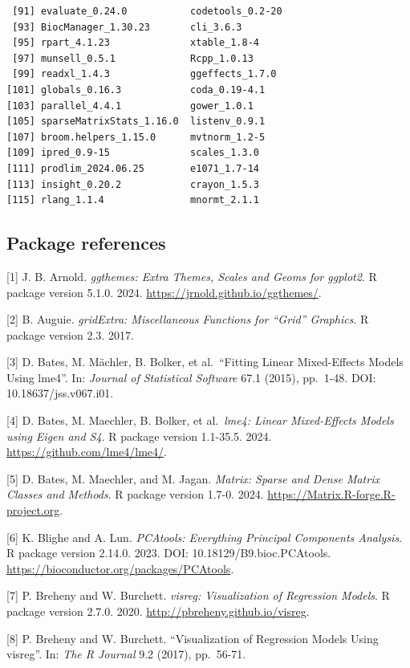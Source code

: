 \documentclass[
  letterpaper,
  DIV=11,
  numbers=noendperiod]{scrreprt}
\begin{document}
\begin{verbatim}
 [91] evaluate_0.24.0           codetools_0.2-20         
 [93] BiocManager_1.30.23       cli_3.6.3                
 [95] rpart_4.1.23              xtable_1.8-4             
 [97] munsell_0.5.1             Rcpp_1.0.13              
 [99] readxl_1.4.3              ggeffects_1.7.0          
[101] globals_0.16.3            coda_0.19-4.1            
[103] parallel_4.4.1            gower_1.0.1              
[105] sparseMatrixStats_1.16.0  listenv_0.9.1            
[107] broom.helpers_1.15.0      mvtnorm_1.2-5            
[109] ipred_0.9-15              scales_1.3.0             
[111] prodlim_2024.06.25        e1071_1.7-14             
[113] insight_0.20.2            crayon_1.5.3             
[115] rlang_1.1.4               mnormt_2.1.1             
\end{verbatim}

\subsection{Package references}\label{package-references-4}

{[}1{]} J. B. Arnold. \emph{ggthemes: Extra Themes, Scales and Geoms for
ggplot2}. R package version 5.1.0. 2024.
\url{https://jrnold.github.io/ggthemes/}.

{[}2{]} B. Auguie. \emph{gridExtra: Miscellaneous Functions for ``Grid''
Graphics}. R package version 2.3. 2017.

{[}3{]} D. Bates, M. Mächler, B. Bolker, et al.~``Fitting Linear
Mixed-Effects Models Using lme4''. In: \emph{Journal of Statistical
Software} 67.1 (2015), pp.~1-48. DOI: 10.18637/jss.v067.i01.

{[}4{]} D. Bates, M. Maechler, B. Bolker, et al.~\emph{lme4: Linear
Mixed-Effects Models using Eigen and S4}. R package version 1.1-35.5.
2024. \url{https://github.com/lme4/lme4/}.

{[}5{]} D. Bates, M. Maechler, and M. Jagan. \emph{Matrix: Sparse and
Dense Matrix Classes and Methods}. R package version 1.7-0. 2024.
\url{https://Matrix.R-forge.R-project.org}.

{[}6{]} K. Blighe and A. Lun. \emph{PCAtools: Everything Principal
Components Analysis}. R package version 2.14.0. 2023. DOI:
10.18129/B9.bioc.PCAtools.
\url{https://bioconductor.org/packages/PCAtools}.

{[}7{]} P. Breheny and W. Burchett. \emph{visreg: Visualization of
Regression Models}. R package version 2.7.0. 2020.
\url{http://pbreheny.github.io/visreg}.

{[}8{]} P. Breheny and W. Burchett. ``Visualization of Regression Models
Using visreg''. In: \emph{The R Journal} 9.2 (2017), pp.~56-71.
\end{document}
